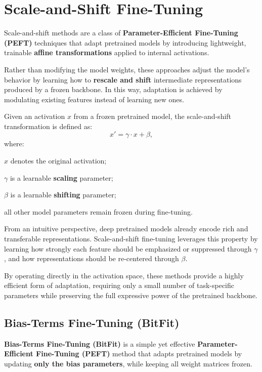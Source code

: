 \section{Scale-and-Shift Fine-Tuning}

Scale-and-shift methods are a class of
\textbf{Parameter-Efficient Fine-Tuning (PEFT)} techniques that adapt pretrained models by
introducing lightweight, trainable \textbf{affine transformations} applied to internal
activations.

Rather than modifying the model weights, these approaches adjust the model’s behavior by
learning how to \textbf{rescale and shift} intermediate representations produced by a frozen
backbone. In this way, adaptation is achieved by modulating existing features instead of
learning new ones.

Given an activation $x$ from a frozen pretrained model, the scale-and-shift transformation is
defined as:
\[
x' = \gamma \cdot x + \beta,
\]
where:
\begin{compactitemize}
    \item $x$ denotes the original activation;
    \item $\gamma$ is a learnable \textbf{scaling} parameter;
    \item $\beta$ is a learnable \textbf{shifting} parameter;
    \item all other model parameters remain frozen during fine-tuning.
\end{compactitemize}

From an intuitive perspective, deep pretrained models already encode rich and transferable
representations. Scale-and-shift fine-tuning leverages this property by learning how strongly
each feature should be emphasized or suppressed through $\gamma$, and how representations
should be re-centered through $\beta$.

By operating directly in the activation space, these methods provide a highly efficient form
of adaptation, requiring only a small number of task-specific parameters while preserving the
full expressive power of the pretrained backbone.

\subsection{Bias-Terms Fine-Tuning (BitFit)}

\textbf{Bias-Terms Fine-Tuning (BitFit)} is a simple yet effective
\textbf{Parameter-Efficient Fine-Tuning (PEFT)} method that adapts pretrained models by
updating \textbf{only the bias parameters}, while keeping all weight matrices frozen.

